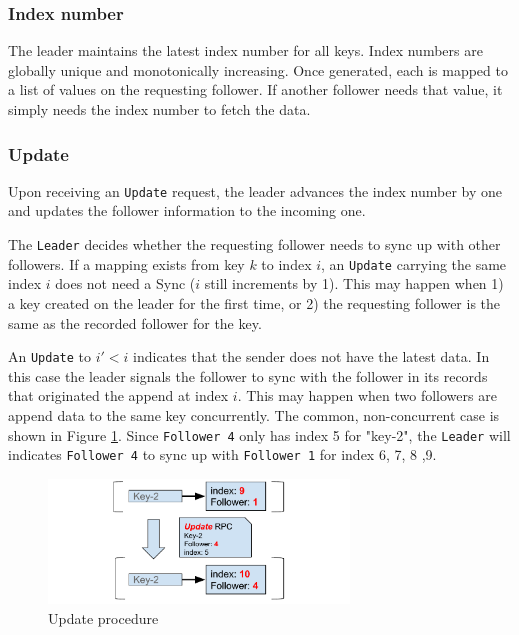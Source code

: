 \documentclass[11pt,english,twocolumn]{article}
\begin{document}
\subsubsection{Index number}
The leader maintains the latest index number for all keys. Index numbers are
globally unique and monotonically increasing. Once generated, each is mapped
to a list of values on the requesting follower. If another follower needs that
value, it simply needs the index number to fetch the data.

\vspace{-0.2cm}
\subsubsection{Update}
Upon receiving an \texttt{Update} request, the leader advances the index
number by one and updates the follower information to the incoming one.

The \texttt{Leader} decides whether the requesting follower needs to sync up
with other followers. If a mapping exists from key $k$ to index $i$, an
\texttt{Update} carrying the same index $i$ does not need a Sync ($i$ still
increments by 1). This may happen when 1) a key created on the leader for the
first time, or 2) the requesting follower is the same as the recorded follower
for the key.

An \texttt{Update} to $i' < i$ indicates that the sender does not have the
latest data. In this case the leader signals the follower to sync with the
follower in its records that originated the append at index $i$. This may happen
when two followers are append data to the same key concurrently. The common,
non-concurrent case is shown in Figure \ref{CommonUpdate}. Since \texttt{Follower 4} only has index 5 for "key-2", the \texttt{Leader} will indicates \texttt{Follower 4} to sync up with \texttt{Follower 1} for index 6, 7, 8 ,9.

\begin{figure}[h]
\includegraphics[width=8cm]{figure/update.pdf}
\caption{Update procedure}
\label{CommonUpdate}
\end{figure}

\vspace{-0.3cm}
\end{document}

